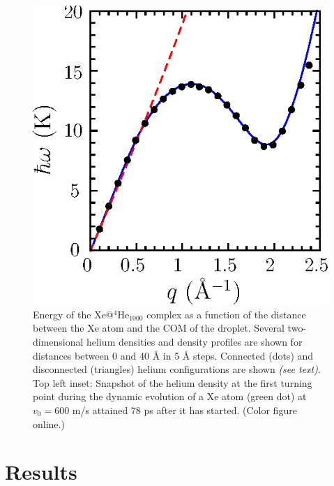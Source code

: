 		\begin{figure}[!] 
			\includegraphics[width=1.0\linewidth,clip=true]{fig1}
			\caption{ \label{fig1} Energy of the Xe@$^4$He$_{1000}$ complex as a function of the distance between  the Xe atom and the  COM of the droplet. Several two-dimensional helium densities and density profiles are shown for distances between 0 and 40 \AA{} in 5  \AA{} steps. Connected (dots) and disconnected (triangles) helium configurations are shown \emph{(see text)}. Top left inset: Snapshot of the helium density at the first turning point  during the dynamic evolution of a Xe atom (green dot) at $v_0 = 600$ m/s attained  78 ps after it has started. (Color figure online.)}
		\end{figure}

	\section{Results}\label{metho}

